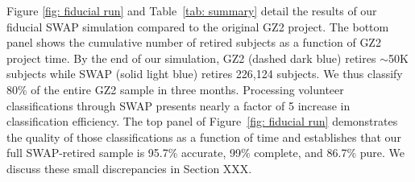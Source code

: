 Figure \ref{fig: fiducial run} and Table~\ref{tab: summary} detail the results of our fiducial SWAP simulation compared to the original GZ2 project. The bottom panel shows the cumulative number of retired subjects as a function of GZ2 project time. By the end of our simulation, GZ2 (dashed dark blue) retires $\sim$50K subjects while SWAP (solid light blue) retires 226,124 subjects. We thus classify 80\% of the entire GZ2 sample in three months. Processing volunteer classifications through SWAP presents nearly a factor of 5 increase in classification efficiency. The top panel of Figure~\ref{fig: fiducial run} demonstrates the quality of those classifications as a function of time and establishes that our full SWAP-retired sample is 95.7\% accurate, 99\% complete, and 86.7\% pure. We discuss these small discrepancies in Section XXX.

